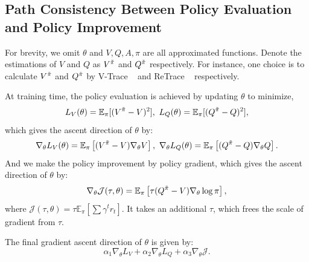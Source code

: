 \subsection{Path Consistency Between Policy Evaluation and Policy Improvement}
\label{sec:equiv}

For brevity, we omit $\theta$ and $V, Q, A, \pi$ are all approximated functions.
Denote the estimations of $V$ and $Q$ as $V^{\Tilde{\pi}}$ and $Q^{\Tilde{\pi}}$ respectively. For instance, one choice is to calculate $V^{\Tilde{\pi}}$ and $Q^{\Tilde{\pi}}$ by V-Trace ~\citep{impala} and ReTrace ~\citep{retrace} respectively.

At training time, the policy evaluation is achieved by updating $\theta$ to minimize,
$$
\begin{aligned}
    L_V(\theta) = \mathbb{E}_\pi [ (V^{\Tilde{\pi}} - V)^2 ], \ 
    L_Q(\theta) = \mathbb{E}_\pi [ (Q^{\Tilde{\pi}} - Q)^2 ],
\end{aligned}
$$ 
which gives the ascent direction of $\theta$ by:
\begin{equation}
\label{eq:grad_qv}
    \begin{aligned}
        \nabla_\theta L_V(\theta)
        = \mathbb{E}_\pi \left[ (V^{\Tilde{\pi}} - V) \nabla_\theta V \right], \ 
        \nabla_\theta L_Q(\theta)
        = \mathbb{E}_\pi \left[ (Q^{\Tilde{\pi}} - Q) \nabla_\theta Q \right].
    \end{aligned}
\end{equation}
And we make the policy improvement by policy gradient, which gives the ascent direction of $\theta$ by: 
\begin{equation}
\label{eq:grad_pi}
\begin{aligned}
    \nabla_\theta \mathcal{J}(\tau, \theta) = \mathbb{E}_\pi \left[\tau (Q^{\Tilde{\pi}}  - V ) \nabla_\theta \log \pi \right],
\end{aligned}
\end{equation}
where $\mathcal{J} (\tau, \theta) = \tau \mathbb{E}_\pi [\sum \gamma^t r_t]$.
It takes an additional $\tau$, which frees the scale of gradient from $\tau$.

The final gradient ascent direction of $\theta$ is given by:
\begin{equation}
    \label{eq:grad_all}
    \alpha_1 \nabla_\theta L_V + \alpha_2 \nabla_\theta L_Q + \alpha_3 \nabla_\theta \mathcal{J}.
\end{equation}


